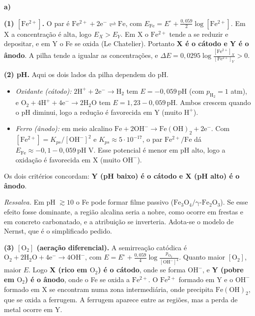 \documentclass{article}%
\begin{document}
\textbf{a)}

\textbf{(1) $[\mathrm{Fe^{2+}}]$.} O par é $\mathrm{Fe^{2+}+2e^-\rightleftharpoons Fe}$, com $E_{\mathrm{Fe}}=E^\circ+\frac{0{,}059}{2}\log[\mathrm{Fe^{2+}}]$. Em X a concentração é alta, logo $E_X>E_Y$. Em X o $\mathrm{Fe^{2+}}$ tende a se reduzir e depositar, e em Y o Fe se oxida (Le Chatelier). Portanto \textbf{X é o cátodo e Y é o ânodo}. A pilha tende a igualar as concentrações, e $\Delta E=0{,}0295\log\frac{[\mathrm{Fe^{2+}}]_X}{[\mathrm{Fe^{2+}}]_Y}>0$.

\textbf{(2) pH.} Aqui os dois lados da pilha dependem do pH.
\begin{itemize}
\item \emph{Oxidante (cátodo):} $\mathrm{2H^++2e^-\to H_2}$ tem $E=-0{,}059\,\mathrm{pH}$ (com $p_{\mathrm{H_2}}=1$ atm), e $\mathrm{O_2+4H^++4e^-\to 2H_2O}$ tem $E=1{,}23-0{,}059\,\mathrm{pH}$. Ambos crescem quando o pH diminui, logo a redução é favorecida em Y (muito $\mathrm{H^+}$).
\item \emph{Ferro (ânodo):} em meio alcalino $\mathrm{Fe+2OH^-\to Fe(OH)_2+2e^-}$. Com $[\mathrm{Fe^{2+}}]=K_{ps}/[\mathrm{OH^-}]^2$ e $K_{ps}\approx 5\cdot10^{-17}$, o par $\mathrm{Fe^{2+}/Fe}$ dá $E_{\mathrm{Fe}}\approx -0{,}1-0{,}059\,\mathrm{pH}$ V. Esse potencial é menor em pH alto, logo a oxidação é favorecida em X (muito $\mathrm{OH^-}$).
\end{itemize}
Os dois critérios concordam: \textbf{Y (pH baixo) é o cátodo e X (pH alto) é o ânodo}.

\emph{Ressalva.} Em pH $\gtrsim 10$ o Fe pode formar filme passivo ($\mathrm{Fe_3O_4/\gamma\text{-}Fe_2O_3}$). Se esse efeito fosse dominante, a região alcalina seria a nobre, como ocorre em frestas e em concreto carbonatado, e a atribuição se inverteria. Adota-se o modelo de Nernst, que é o simplificado pedido.

\textbf{(3) $[\mathrm{O_2}]$ (aeração diferencial).} A semirreação catódica é $\mathrm{O_2+2H_2O+4e^-\to 4OH^-}$, com $E=E^\circ+\frac{0{,}059}{4}\log\frac{p_{\mathrm{O_2}}}{[\mathrm{OH^-}]^4}$. Quanto maior $[\mathrm{O_2}]$, maior $E$. Logo \textbf{X (rico em $\mathrm{O_2}$) é o cátodo}, onde se forma $\mathrm{OH^-}$, e \textbf{Y (pobre em $\mathrm{O_2}$) é o ânodo}, onde o Fe se oxida a $\mathrm{Fe^{2+}}$. O $\mathrm{Fe^{2+}}$ formado em Y e o $\mathrm{OH^-}$ formado em X se encontram numa zona intermediária, onde precipita $\mathrm{Fe(OH)_2}$, que se oxida a ferrugem. A ferrugem aparece entre as regiões, mas a perda de metal ocorre em Y.
\end{document}
